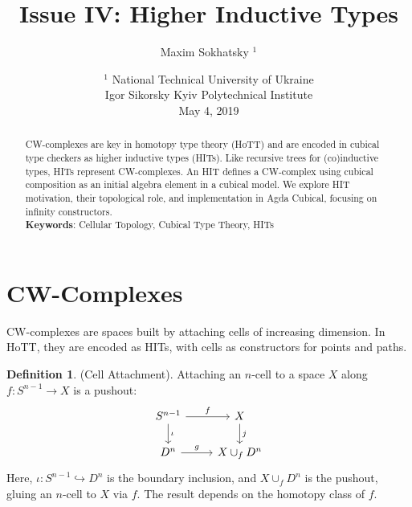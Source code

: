 \documentclass{article}
\theoremstyle{definition}
\newtheorem{definition}{Definition}
\newcommand*{\incmap}{\hookrightarrow}
\begin{document}
\title{Issue IV: Higher Inductive Types}
\author{Maxim Sokhatsky $^1$}
\date{ $^1$ National Technical University of Ukraine \\
       \small Igor Sikorsky Kyiv Polytechnical Institute \\
       May 4, 2019 }
\maketitle

\begin{abstract}
CW-complexes are key in homotopy type theory (HoTT) and are encoded
in cubical type checkers as higher inductive types (HITs). Like
recursive trees for (co)inductive types, HITs represent CW-complexes.
An HIT defines a CW-complex using cubical composition as an initial
algebra element in a cubical model. We explore HIT motivation, their
topological role, and implementation in Agda Cubical, focusing on infinity constructors. \\
{\bf Keywords}: Cellular Topology, Cubical Type Theory, HITs
\end{abstract}

\tableofcontents

\section{CW-Complexes}
CW-complexes are spaces built by attaching cells of increasing
dimension. In HoTT, they are encoded as HITs, with cells as
constructors for points and paths.

\begin{definition} (Cell Attachment).
Attaching an \( n \)-cell to a space \( X \) along \( f : S^{n-1} \to X \) is a pushout:
\[
\begin{tikzcd}
S^{n-1} \arrow[r, "f"] \arrow[d, "\iota"] & X \arrow[d, "j"] \\
D^n \arrow[r, "g"] & X \cup_f D^n
\end{tikzcd}
\]
Here, \( \iota : S^{n-1} \incmap D^n \) is the boundary
inclusion, and \( X \cup_f D^n \) is the pushout, gluing an
\( n \)-cell to \( X \) via \( f \). The result depends on the
homotopy class of \( f \).
\end{definition}
\end{document}
